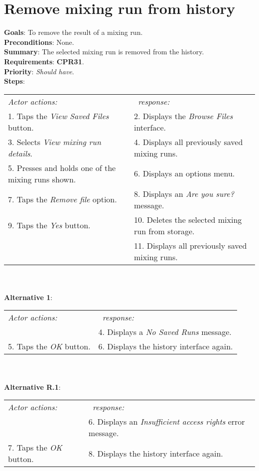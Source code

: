 \section{Remove mixing run from history}
 \label{removemixrun}
  \textbf{Goals}: To remove the result of a mixing run.\\
  \textbf{Preconditions}: None.\\
  \textbf{Summary}: The selected mixing run is removed from the history.\\
  \textbf{Requirements}: \textbf{CPR31}.\\
  \textbf{Priority}: \emph{Should have}.\\
  \textbf{Steps}: \\
    \begin{tabular}{ p{} p{} }
  	\emph{Actor actions:} & \emph{\projectname\ response:} \\
    1. Taps the \emph{View Saved Files} button. & 2. Displays the \emph{Browse Files} interface.\\
    3. Selects \emph{View mixing run details}. & 4. Displays all previously saved mixing runs.\\
    5. Presses and holds one of the mixing runs shown. & 6. Displays an options menu. \\
    7. Taps the \emph{Remove file} option. & 8. Displays an \emph{Are you sure?} message.\\
    9. Taps the \emph{Yes} button. & 10. Deletes the selected mixing run from storage. \\
     & 11. Displays all previously saved mixing runs.
    \end{tabular}
            \\
     \\\textbf{Alternative 1}: \\
    \begin{tabular}{ p{} p{} }
  	\emph{Actor actions:} & \emph{\projectname\ response:} \\
            & 4. Displays a \emph{No Saved Runs} message. \\
    5. Taps the \emph{OK} button. & 6. Displays the history interface again. \\
    \end{tabular}
    \\
     \\\textbf{Alternative R.1}: \\
    \begin{tabular}{ p{} p{} }
  	\emph{Actor actions:} & \emph{\projectname\ response:} \\
            & 6. Displays an \emph{Insufficient access rights} error message. \\
    7. Taps the \emph{OK} button. & 8. Displays the history interface again. \\
    \end{tabular}
